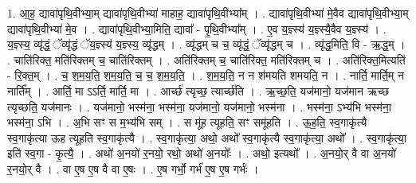 \documentclass[17pt]{extarticle}
\begin{document}
1. आ॒ह॒ द्यावा॑पृथि॒वीभ्या॒म् द्यावा॑पृथि॒वीभ्या॑ माहाह॒ द्यावा॑पृथि॒वीभ्या᳚म् । . द्यावा॑पृथि॒वीभ्या॑ मे॒वैव द्यावा॑पृथि॒वीभ्या॒म् द्यावा॑पृथि॒वीभ्या॑ मे॒व । . द्यावा॑पृथि॒वीभ्या॒मिति॒ द्यावा᳚ - पृ॒थि॒वीभ्या᳚म् । . ए॒व य॒ज्ञ्स्य॑ य॒ज्ञ्स्यै॒वैव य॒ज्ञ्स्य॑ । . य॒ज्ञ्स्य॒ व्यृ॑द्धं॒ ॅव्यृ॑द्धं ॅय॒ज्ञ्स्य॑ य॒ज्ञ्स्य॒ व्यृ॑द्धम् । . व्यृ॑द्धम् च च॒ व्यृ॑द्धं॒ ॅव्यृ॑द्धम् च । . व्यृ॑द्ध॒मिति॒ वि - ऋ॒द्ध॒म् । . चाति॑रिक्त॒ मति॑रिक्तम् च॒ चाति॑रिक्तम् । . अति॑रिक्तम् च॒ चाति॑रिक्त॒ मति॑रिक्तम् च । . अति॑रिक्त॒मित्यति॑ - रि॒क्त॒म् । . च॒ श॒म॒य॒ति॒ श॒म॒य॒ति॒ च॒ च॒ श॒म॒य॒ति॒ । . श॒म॒य॒ति॒ न न श॑मयति शमयति॒ न । . नार्ति॒ मार्ति॒म् न नार्ति᳚म् । . आर्ति॒ मा ऽऽर्ति॒ मार्ति॒ मा । . आर्च्छ॑ त्यृच्छ॒ त्यार्च्छ॑ति । . ऋ॒च्छ॒ति॒ यज॑मानो॒ यज॑मान ऋच्छ त्यृच्छति॒ यज॑मानः । . यज॑मानो॒ भस्म॑ना॒ भस्म॑ना॒ यज॑मानो॒ यज॑मानो॒ भस्म॑ना । . भस्म॑ना॒ ऽभ्य॑भि भस्म॑ना॒ भस्म॑ना॒ ऽभि । . अ॒भि सꣳ स म॒भ्य॑भि सम् । . स मू॑ह त्यूहति॒ सꣳ समू॑हति । . ऊ॒ह॒ति॒ स्व॒गाकृ॑त्यै स्व॒गाकृ॑त्या ऊह त्यूहति स्व॒गाकृ॑त्यै । . स्व॒गाकृ॑त्या॒ अथो॒ अथो᳚ स्व॒गाकृ॑त्यै स्व॒गाकृ॑त्या॒ अथो᳚ । . स्व॒गाकृ॑त्या॒ इति॑ स्व॒गा - कृ॒त्यै॒ । . अथो॑ अ॒नयो॑ र॒नयो॒ रथो॒ अथो॑ अ॒नयोः᳚ । . अथो॒ इत्यथो᳚ । . अ॒नयो॒र् वै वा अ॒नयो॑ र॒नयो॒र् वै । . वा ए॒ष ए॒ष वै वा ए॒षः । . ए॒ष गर्भो॒ गर्भ॑ ए॒ष ए॒ष गर्भः॑ । \newline
\end{document}
